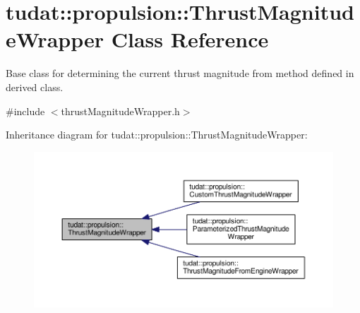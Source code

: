 \hypertarget{classtudat_1_1propulsion_1_1ThrustMagnitudeWrapper}{}\section{tudat\+:\+:propulsion\+:\+:Thrust\+Magnitude\+Wrapper Class Reference}
\label{classtudat_1_1propulsion_1_1ThrustMagnitudeWrapper}


Base class for determining the current thrust magnitude from method defined in derived class.  




{\ttfamily \#include $<$thrust\+Magnitude\+Wrapper.\+h$>$}



Inheritance diagram for tudat\+:\+:propulsion\+:\+:Thrust\+Magnitude\+Wrapper\+:
\nopagebreak
\begin{figure}[H]
\begin{center}
\leavevmode
\includegraphics[width=350pt]{classtudat_1_1propulsion_1_1ThrustMagnitudeWrapper__inherit__graph}
\end{center}
\end{figure}
